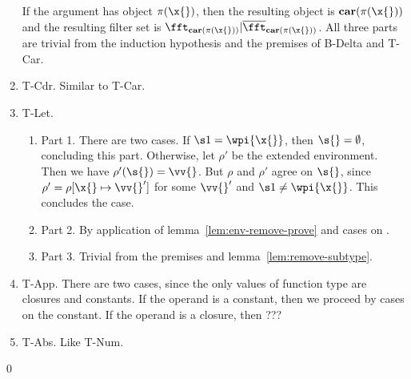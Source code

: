 \documentclass{article}[12pt]
\begin{document}
\begin{enumerate}
  If the argument has
  object $\pi(\x{})$, then the resulting object is $\pecar(\pi(\x{}))$
  and the resulting filter set is
  $\fft_{\pecar(\pi(\x{}))}|\comp{\fft}_{\pecar(\pi(\x{}))}$.  All
  three parts are trivial from the induction hypothesis and the
  premises of {\sc B-Delta} and {\sc T-Car}.
\item {\sc T-Cdr}. Similar to {\sc T-Car}.
\item {\sc T-Let}. 
  \begin{enumerate}
  \item Part 1. There are two cases.  If $\s1 = \wpi{\x{}}$, then
    $\s{} = \noobj$, concluding this part.  Otherwise, let $\rho'$
    be the extended environment.  Then we have $\rho'(\s{}) = \vv{}$.
    But $\rho$ and $\rho'$ agree on $\s{}$, since $\rho' =
    \rho[\x{}\mapsto\vv{}']$ for some $\vv{}'$ and $\s1 \neq
    \wpi{\x{}}$.  
    This concludes the
    case.  
    \item Part 2. By application of lemma~\ref{lem:env-remove-prove}
      and cases on \vv{}.
    \item Part 3.  Trivial from the premises and lemma~\ref{lem:remove-subtype}.
  \end{enumerate}
\item {\sc T-App}. There are two cases, since the only values of
  function type are closures and constants.  If the operand is a
  constant, then we proceed by cases on the constant.  If the operand
  is a closure, then ???
\item {\sc T-Abs}. Like {\sc T-Num}. %
\end{enumerate}
\qed 
\end{document}
